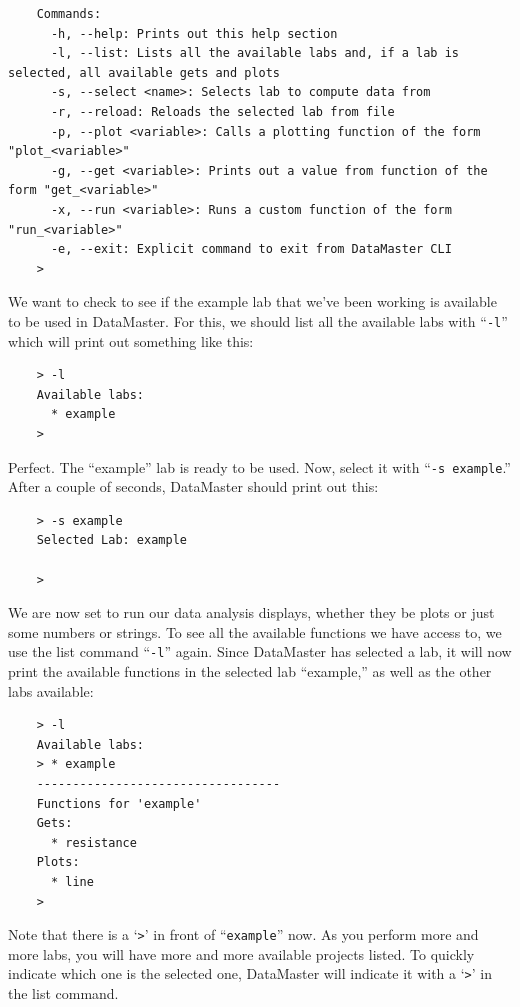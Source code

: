 \documentclass[12pt]{article}
\begin{document}
{\begin{framed}
\begin{lstlisting}
    Commands:
      -h, --help: Prints out this help section
      -l, --list: Lists all the available labs and, if a lab is selected, all available gets and plots
      -s, --select <name>: Selects lab to compute data from
      -r, --reload: Reloads the selected lab from file
      -p, --plot <variable>: Calls a plotting function of the form "plot_<variable>"
      -g, --get <variable>: Prints out a value from function of the form "get_<variable>"
      -x, --run <variable>: Runs a custom function of the form "run_<variable>"
      -e, --exit: Explicit command to exit from DataMaster CLI
    > 

  \end{lstlisting}
\end{framed}
We want to check to see if the example lab that we've been working is available to be used in DataMaster. For this, we should list all the available labs with ``\texttt{-l}'' which will print out something like this:
\begin{framed}
  \begin{lstlisting}
    > -l
    Available labs:
      * example
    > 
  \end{lstlisting}
\end{framed}
Perfect. The ``example'' lab is ready to be used. Now, select it with ``\texttt{-s example}.'' After a couple of seconds, DataMaster should print out this:
\begin{framed}
  \begin{lstlisting}
    > -s example
    Selected Lab: example

    > 
  \end{lstlisting}
\end{framed}
We are now set to run our data analysis displays, whether they be plots or just some numbers or strings. To see all the available functions we have access to, we use the list command ``\texttt{-l}'' again. Since DataMaster has selected a lab, it will now print the available functions in the selected lab ``example,'' as well as the other labs available:
\begin{framed}
  \begin{lstlisting}
    > -l 
    Available labs:
    > * example
    ----------------------------------
    Functions for 'example'
    Gets:
      * resistance
    Plots:
      * line
    > 
  \end{lstlisting}
\end{framed}
Note that there is a `\texttt{>}' in front of ``\texttt{example}'' now. As you perform more and more labs, you will have more and more available projects listed. To quickly indicate which one is the selected one, DataMaster will indicate it with a `\texttt{>}' in the list command.

}
\end{document}
